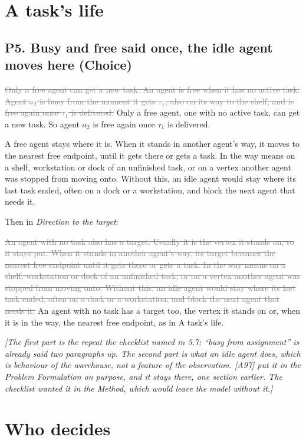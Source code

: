 \documentclass[11pt,a4paper]{article}
\newcommand{\new}[1]{\textcolor{newc}{#1}}
\newcommand{\old}[1]{\textcolor{gray}{\sout{#1}}}
\newcommand{\note}[1]{{\small\itshape [#1]}}
\newcommand{\pitem}[2]{\subsection*{P#1. #2}}
\begin{document}
\section*{A task's life}

\pitem{5}{Busy and free said once, the idle agent moves here (Choice)}
\old{Only a free agent can get a new task. An agent is free when it has no
active task. Agent $a_2$ is busy from the moment it gets $\tau_1$, also on
its way to the shelf, and is free again once $\tau_1$ is delivered.}
\new{Only a free agent, one with no active task, can get a new task. So
agent $a_2$ is free again once $\tau_1$ is delivered.}

\new{A free agent stays where it is. When it stands in another agent's way,
it moves to the nearest free endpoint, until it gets there or gets a task.
In the way means on a shelf, workstation or dock of an unfinished task, or
on a vertex another agent was stopped from moving onto. Without this, an
idle agent would stay where its last task ended, often on a dock or a
workstation, and block the next agent that needs it.}

Then in \emph{Direction to the target}:

\old{An agent with no task also has a target. Usually it is the vertex it
stands on, so it stays put. When it stands in another agent's way, its
target becomes the nearest free endpoint until it gets there or gets a task.
In the way means on a shelf, workstation or dock of an unfinished task, or
on a vertex another agent was stopped from moving onto. Without this, an
idle agent would stay where its last task ended, often on a dock or a
workstation, and block the next agent that needs it.}
\new{An agent with no task has a target too, the vertex it stands on or,
when it is in the way, the nearest free endpoint, as in A task's life.}

\note{The first part is the repeat the checklist named in 5.7: ``busy from
assignment'' is already said two paragraphs up. The second part is what an
idle agent does, which is behaviour of the warehouse, not a feature of the
observation. [A97] put it in the Problem Formulation on purpose, and it
stays there, one section earlier. The checklist wanted it in the Method,
which would leave the model without it.}

\section*{Who decides}
\end{document}
